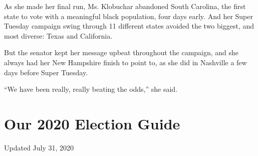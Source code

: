 As she made her final run, Ms. Klobuchar abandoned South Carolina, the
first state to vote with a meaningful black population, four days early.
And her Super Tuesday campaign swing through 11 different states avoided
the two biggest, and most diverse: Texas and California.

But the senator kept her message upbeat throughout the campaign, and she
always had her New Hampshire finish to point to, as she did in Nashville
a few days before Super Tuesday.

``We have been really, really beating the odds,'' she said.

\hypertarget{our-2020-election-guide}{%
\section{Our 2020 Election Guide}\label{our-2020-election-guide}}

Updated July 31, 2020

